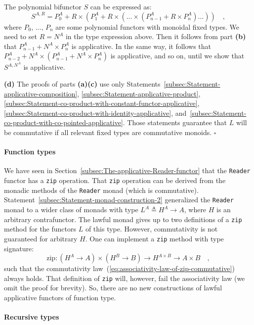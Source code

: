 The polynomial bifunctor $S$ can be expressed as:
\[
S^{A,R}=P_{0}^{A}+R\times(P_{1}^{A}+R\times(...\times(P_{n-1}^{A}+R\times P_{n}^{A})...))\quad,
\]
where $P_{0}$, ..., $P_{n}$ are some polynomial functors with monoidal
fixed types. We need to set $R=N^{A}$ in the type expression above.
Then it follows from part \textbf{(b)} that $P_{n-1}^{A}+N^{A}\times P_{n}^{A}$
is applicative. In the same way, it follows that $P_{n-2}^{A}+N^{A}\times(P_{n-1}^{A}+N^{A}\times P_{n}^{A})$
is applicative, and so on, until we show that $S^{A,N^{A}}$ is applicative.

\textbf{(d)} The proofs of parts \textbf{(a)}\textendash \textbf{(c)}
use only Statements~\ref{subsec:Statement-applicative-composition},
\ref{subsec:Statement-applicative-product}, \ref{subsec:Statement-co-product-with-constant-functor-applicative},
\ref{subsec:Statement-co-product-with-identity-applicative}, and~\ref{subsec:Statement-co-product-with-co-pointed-applicative}.
Those statements guarantee that $L$ will be commutative if all relevant
fixed types are commutative monoids. $\square$

\paragraph{Function types}

We have seen in Section~\ref{subsec:The-applicative-Reader-functor}
that the \lstinline!Reader! functor has a \lstinline!zip! operation.
That \lstinline!zip! operation can be derived from the monadic methods
of the \lstinline!Reader! monad (which is commutative). Statement~\ref{subsec:Statement-monad-construction-2}
generalized the \lstinline!Reader! monad to a wider class of monads
with type $L^{A}\triangleq H^{A}\rightarrow A$, where $H$ is an
arbitrary contrafunctor. The lawful monad gives up to two definitions
of a \lstinline!zip! method for the functors $L$ of this type. However,
commutativity is not guaranteed for arbitrary $H$. One can implement
a \lstinline!zip! method with type signature:
\[
\text{zip}:(H^{A}\rightarrow A)\times(H^{B}\rightarrow B)\rightarrow H^{A\times B}\rightarrow A\times B\quad,
\]
such that the commutativity law~(\ref{eq:associativity-law-of-zip-commutative})
always holds. That definition of \lstinline!zip! will, however, fail
the associativity law (we omit the proof for brevity). So, there are
no new constructions of lawful applicative functors of function type.

\paragraph{Recursive types}

